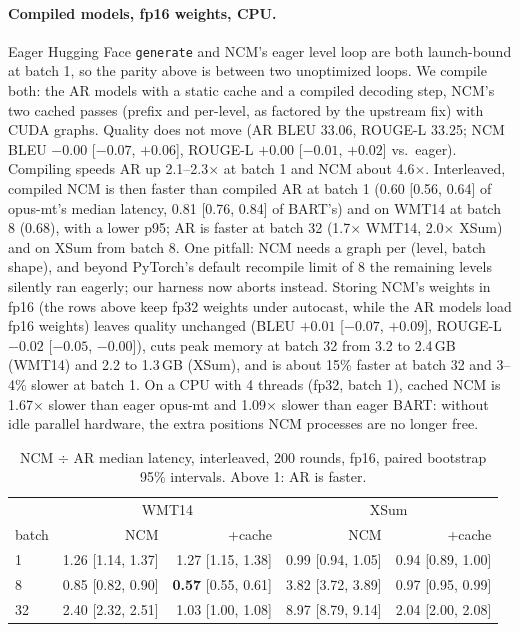 \documentclass[11pt]{article}
\begin{document}
\paragraph{Compiled models, fp16 weights, CPU.} Eager Hugging Face \texttt{generate} and
NCM's eager level loop are both launch-bound at batch 1, so the parity above is between two
unoptimized loops. We compile both: the AR models with a static cache and a compiled decoding
step, NCM's two cached passes (prefix and per-level, as factored by the upstream fix) with
CUDA graphs. Quality does not move (AR BLEU 33.06, ROUGE-L 33.25; NCM BLEU $-0.00$
[$-0.07$, $+0.06$], ROUGE-L $+0.00$ [$-0.01$, $+0.02$] vs.\ eager). Compiling speeds AR up
2.1--2.3$\times$ at batch 1 and NCM about 4.6$\times$. Interleaved, compiled NCM is then
faster than compiled AR at batch 1 (0.60 [0.56, 0.64] of opus-mt's median latency, 0.81
[0.76, 0.84] of BART's) and on WMT14 at batch 8 (0.68), with a lower p95; AR is faster at
batch 32 (1.7$\times$ WMT14, 2.0$\times$ XSum) and on XSum from batch 8. One pitfall: NCM
needs a graph per (level, batch shape), and beyond PyTorch's default recompile limit of 8
the remaining levels silently ran eagerly; our harness now aborts instead.
Storing NCM's weights in fp16 (the rows above keep fp32 weights under autocast, while the
AR models load fp16 weights) leaves quality unchanged (BLEU $+0.01$ [$-0.07$, $+0.09$],
ROUGE-L $-0.02$ [$-0.05$, $-0.00$]), cuts peak memory at batch 32 from 3.2 to 2.4\,GB
(WMT14) and 2.2 to 1.3\,GB (XSum), and is about 15\% faster at batch 32 and 3--4\% slower at
batch 1. On a CPU with 4 threads (fp32, batch 1), cached NCM is 1.67$\times$ slower than
eager opus-mt and 1.09$\times$ slower than eager BART: without idle parallel hardware, the
extra positions NCM processes are no longer free.

\begin{table}[t]\centering\small
\caption{NCM $\div$ AR median latency, interleaved, 200 rounds, fp16, paired bootstrap 95\%
intervals. Above 1: AR is faster.}\label{tab:interleaved}
\begin{tabular}{lrrrr}
\toprule
 & \multicolumn{2}{c}{WMT14} & \multicolumn{2}{c}{XSum}\\
batch & NCM & +cache & NCM & +cache\\
\midrule
1 & 1.26 [1.14, 1.37] & 1.27 [1.15, 1.38] & 0.99 [0.94, 1.05] & 0.94 [0.89, 1.00]\\
8 & 0.85 [0.82, 0.90] & \textbf{0.57} [0.55, 0.61] & 3.82 [3.72, 3.89] & 0.97 [0.95, 0.99]\\
32 & 2.40 [2.32, 2.51] & 1.03 [1.00, 1.08] & 8.97 [8.79, 9.14] & 2.04 [2.00, 2.08]\\
\bottomrule
\end{tabular}
\end{table}
\end{document}
